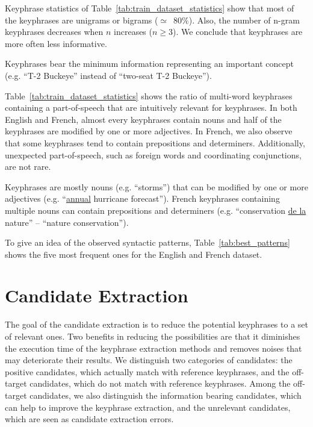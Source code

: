     Keyphrase statistics of Table~\ref{tab:train_dataset_statistics} show that
    most of the keyphrases are unigrams or bigrams ($\simeq$~$80\%$). Also, the
    number of n-gram keyphrases decreases when $n$ increases ($n\geq3$). We
    conclude that keyphrases are more often less informative.
    
    \begin{property}\label{prop:informativity}
      Keyphrases bear the minimum information representing an important concept
      (e.g. ``T-2 Buckeye'' instead of ``two-seat T-2 Buckeye'').
    \end{property}

    Table~\ref{tab:train_dataset_statistics} shows the ratio of multi-word
    keyphrases containing a part-of-speech that are intuitively relevant for
    keyphrases. In both English and French, almost every keyphrases contain
    nouns and half of the keyphrases are modified by one or more adjectives. In
    French, we also observe that some keyphrases tend to contain prepositions
    and determiners. Additionally, unexpected part-of-speech, such as foreign
    words and coordinating conjunctions, are not rare.

    \begin{property}\label{prop:noun_phrases}
      Keyphrases are mostly nouns (e.g. ``storms'') that can be modified by one
      or more adjectives (e.g. ``\underline{annual} hurricane forecast'').
      French keyphrases containing multiple nouns can contain prepositions and
      determiners (e.g. ``conservation \underline{de la} nature'' -- ``nature
      conservation'').
    \end{property}

    To give an idea of the observed syntactic patterns,
    Table~\ref{tab:best_patterns} shows the five most frequent ones for the
    English and French dataset.

\section{Candidate Extraction}
\label{sec:candidate_extraction}
  The goal of the candidate extraction is to reduce the potential keyphrases to
  a set of relevant ones. Two benefits in reducing the possibilities are that it
  diminishes the execution time of the keyphrase extraction methods and removes
  noises that may deteriorate their results. We distinguish two categories of
  candidates: the positive candidates, which actually match with reference
  keyphrases, and the off-target candidates, which do not match with reference
  keyphrases. Among the off-target candidates, we also distinguish the
  information bearing candidates, which can help to improve the keyphrase
  extraction, and the unrelevant candidates, which are seen as candidate
  extraction errors.

